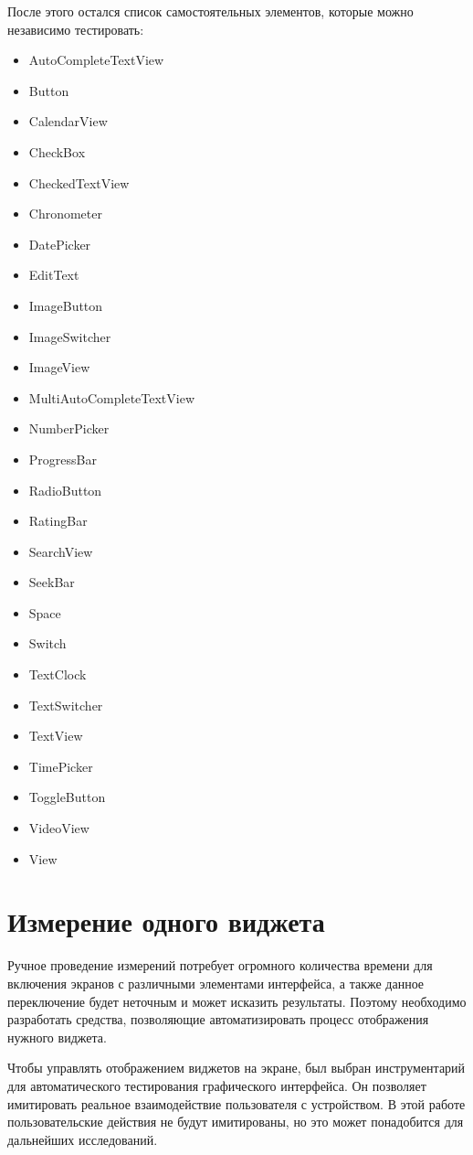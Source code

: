 \documentclass[a4paper,14pt]{extarticle} %
\begin{document}
	После этого остался список самостоятельных элементов, которые можно независимо тестировать:
	\begin{itemize}
		\item AutoCompleteTextView
		\item Button
		\item CalendarView
		\item CheckBox
		 \item CheckedTextView
		 \item Chronometer
		 \item DatePicker
		 \item EditText
		 \item ImageButton
		 \item ImageSwitcher
		 \item ImageView
		 \item MultiAutoCompleteTextView
		 \item NumberPicker
		 \item ProgressBar 
		 \item RadioButton
		 \item RatingBar
		 \item SearchView
		 \item SeekBar
		 \item Space
		 \item Switch
		 \item TextClock
		 \item TextSwitcher
		 \item TextView
		 \item TimePicker
		 \item ToggleButton
		 \item VideoView
		 \item View
		
	\end{itemize}
	
	\clearpage
	\section{Измерение одного виджета}
	
	Ручное проведение измерений потребует огромного количества времени для включения экранов с различными элементами интерфейса, а также данное переключение будет неточным и может исказить результаты. Поэтому необходимо разработать средства, позволяющие автоматизировать процесс отображения нужного виджета.
	
	Чтобы управлять отображением виджетов на экране, был выбран инструментарий для автоматического тестирования графического интерфейса. Он позволяет имитировать реальное взаимодействие пользователя с устройством. В этой работе пользовательские действия не будут имитированы, но это может понадобится для дальнейших исследований.
	
\end{document}
